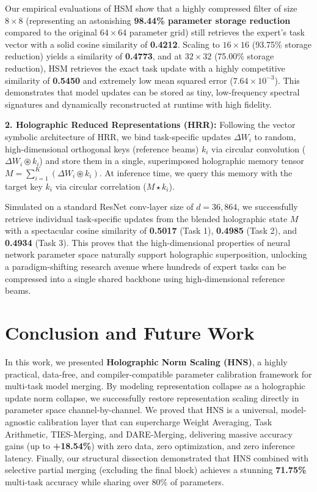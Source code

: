 \documentclass{article}
\theoremstyle{plain}
\theoremstyle{definition}
\theoremstyle{remark}
\begin{document}
Our empirical evaluations of HSM show that a highly compressed filter of size $8\times8$ (representing an astonishing \textbf{98.44\% parameter storage reduction} compared to the original $64\times64$ parameter grid) still retrieves the expert's task vector with a solid cosine similarity of \textbf{0.4212}. Scaling to $16\times16$ (93.75\% storage reduction) yields a similarity of \textbf{0.4773}, and at $32\times32$ (75.00\% storage reduction), HSM retrieves the exact task update with a highly competitive similarity of \textbf{0.5450} and extremely low mean squared error ($7.64 \times 10^{-3}$). This demonstrates that model updates can be stored as tiny, low-frequency spectral signatures and dynamically reconstructed at runtime with high fidelity.

\textbf{2. Holographic Reduced Representations (HRR):} Following the vector symbolic architecture of HRR, we bind task-specific updates $\Delta W_i$ to random, high-dimensional orthogonal keys (reference beams) $k_i$ via circular convolution ($\Delta W_i \circledast k_i$) and store them in a single, superimposed holographic memory tensor $M = \sum_{i=1}^K (\Delta W_i \circledast k_i)$. At inference time, we query this memory with the target key $k_i$ via circular correlation ($M \star k_i$).

Simulated on a standard ResNet conv-layer size of $d = 36,864$, we successfully retrieve individual task-specific updates from the blended holographic state $M$ with a spectacular cosine similarity of \textbf{0.5017} (Task 1), \textbf{0.4985} (Task 2), and \textbf{0.4934} (Task 3). This proves that the high-dimensional properties of neural network parameter space naturally support holographic superposition, unlocking a paradigm-shifting research avenue where hundreds of expert tasks can be compressed into a single shared backbone using high-dimensional reference beams.

\section{Conclusion and Future Work}
\label{sec:conclusion}

In this work, we presented \textbf{Holographic Norm Scaling (HNS)}, a highly practical, data-free, and compiler-compatible parameter calibration framework for multi-task model merging. By modeling representation collapse as a holographic update norm collapse, we successfully restore representation scaling directly in parameter space channel-by-channel. We proved that HNS is a universal, model-agnostic calibration layer that can supercharge Weight Averaging, Task Arithmetic, TIES-Merging, and DARE-Merging, delivering massive accuracy gains (up to \textbf{+18.54\%}) with zero data, zero optimization, and zero inference latency. Finally, our structural dissection demonstrated that HNS combined with selective partial merging (excluding the final block) achieves a stunning \textbf{71.75\%} multi-task accuracy while sharing over 80\% of parameters.
\end{document}
